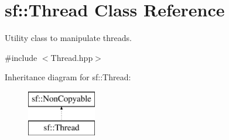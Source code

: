 \hypertarget{classsf_1_1Thread}{\section{sf\-:\-:Thread Class Reference}
\label{classsf_1_1Thread}
}


Utility class to manipulate threads.  




{\ttfamily \#include $<$Thread.\-hpp$>$}

Inheritance diagram for sf\-:\-:Thread\-:\begin{figure}[H]
\begin{center}
\leavevmode
\includegraphics[height=2.000000cm]{classsf_1_1Thread}
\end{center}
\end{figure}
